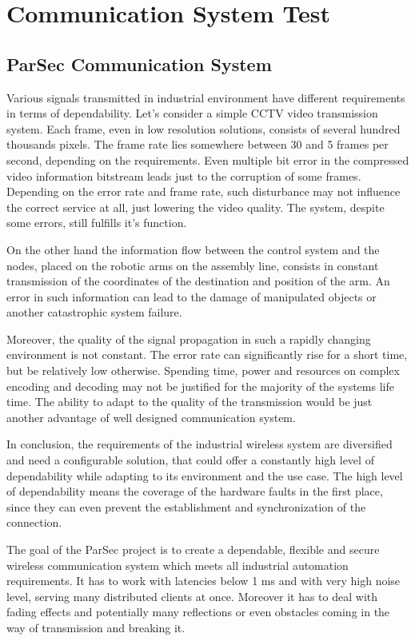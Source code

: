 \chapter{Communication System Test}\label{ch:experiment}



\section {ParSec Communication System}
Various signals transmitted in industrial environment have different requirements in terms of dependability. Let's consider a simple CCTV video transmission system. Each frame, even in low resolution solutions, consists of several hundred thousands pixels. The frame rate lies somewhere between 30 and 5 frames per second, depending on the requirements. Even multiple bit error in the compressed video information bitstream leads just to the corruption of some frames. Depending on the error rate and frame rate, such disturbance may not influence the correct service at all, just lowering the video quality. The system, despite some errors, still fulfills it's function.

On the other hand the information flow between the control system and the nodes, placed on the robotic arms on the assembly line, consists in constant transmission of the coordinates of the destination and position of the arm. An error in such information can lead to the damage of manipulated objects or another catastrophic system failure.

Moreover, the quality of the signal propagation in such a rapidly changing environment is not constant. The error rate can significantly rise for a short time, but be relatively low otherwise. Spending time, power and resources on complex encoding and decoding may not be justified for the majority of the systems life time. The ability to adapt to the quality of the transmission would be just another advantage of well designed communication system.

In conclusion, the requirements of the industrial wireless system are diversified and need a configurable solution, that could offer a constantly high level of dependability while adapting to its environment and the use case. The high level of dependability means the coverage of the hardware faults in the first place, since they can even prevent the establishment and synchronization of the connection.

The goal of the ParSec project is to create a dependable, flexible and secure wireless communication system which meets all industrial automation requirements. It has to work with latencies below 1 ms and with very high noise level, serving many distributed clients at once. Moreover it has to deal with fading effects and potentially many reflections or even obstacles coming in the way of transmission and breaking it.


